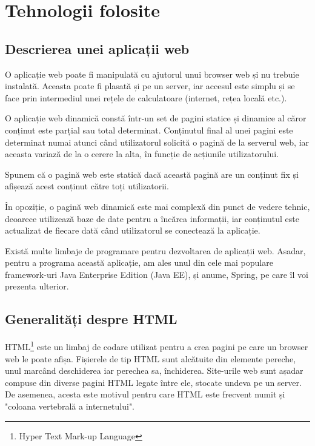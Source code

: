 \chapter{Tehnologii folosite}

\section{Descrierea unei aplicații web}

O aplicație web poate fi manipulată cu ajutorul unui browser web și nu trebuie instalată. Aceasta poate fi plasată și pe un server, iar accesul este simplu și se face prin intermediul unei rețele de calculatoare (internet, rețea locală etc.).\newline

O aplicație web dinamică constă într-un set de pagini statice și dinamice al căror conținut este parțial sau total determinat. Conținutul final al unei pagini este determinat numai atunci când utilizatorul solicită o pagină de la serverul web, iar aceasta variază de la o cerere la alta, în funcție de acțiunile utilizatorului.\newline

Spunem că o pagină web este statică dacă această pagină are un conținut fix și afișează acest conținut către toți utilizatorii.\newline

În opoziție, o pagină web dinamică este mai complexă din punct de vedere tehnic, deoarece utilizează baze de date pentru a încărca informații, iar conținutul este actualizat de fiecare dată când utilizatorul se conectează la aplicație.\newline

Există multe limbaje de programare pentru dezvoltarea de aplicații web.
Asadar, pentru a programa această aplicație, am ales unul din cele mai populare framework-uri Java Enterprise Edition (Java EE), și anume, Spring, pe care îl voi prezenta ulterior.
\newline
\section{Generalități despre HTML}

HTML\footnote{Hyper Text Mark-up Language} este un limbaj de codare utilizat pentru a crea pagini pe care un browser web le poate afișa. Fișierele de tip HTML sunt alcătuite din elemente pereche, unul marcând deschiderea iar perechea sa, închiderea.\newline
Site-urile web sunt așadar compuse din diverse pagini HTML legate între ele, stocate undeva pe un server. De asemenea, acesta este motivul pentru care HTML este frecvent numit și "coloana vertebrală a internetului".\newline

